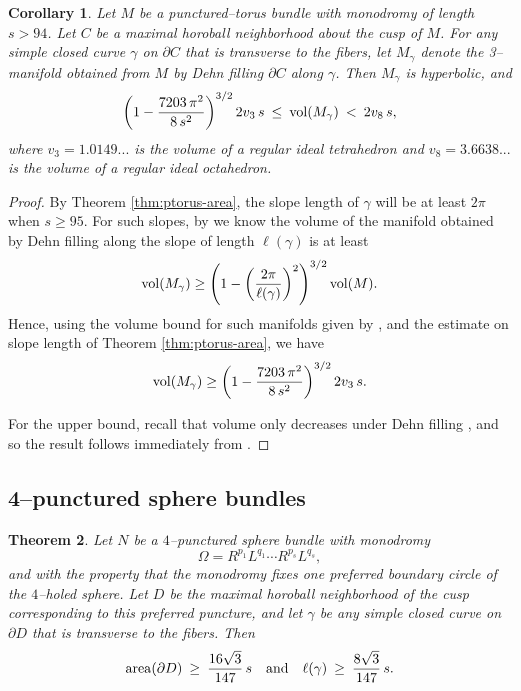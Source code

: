 \documentclass[11pt]{amsart}
\newcommand{\vol}{{\rm vol}}
\newcommand{\area}{{\rm area}}
\newcommand{\bdy}{{\partial}}
\theoremstyle{plain}
\newtheorem{theorem}{Theorem}[section]
\newtheorem{corollary}[theorem]{Corollary}
\theoremstyle{definition}
\begin{document}
\begin{corollary}\label{cor:ptorus-volume}
Let $M$ be a punctured--torus bundle with monodromy of length $s>94$.
Let $C$ be a maximal horoball neighborhood about the cusp of $M$.  For
any simple closed curve $\gamma$ on $\bdy C$ that is transverse to the
fibers, let $M_{\gamma}$ denote the 3--manifold obtained from $M$ by
Dehn filling $\bdy C$ along $\gamma$.  Then $M_{\gamma}$ is
hyperbolic, and
$$ \left(1-\dfrac{7203 \, \pi^2 }{8 \, s^2} \right)^{3/2} 2 v_3 \, s\:
 \leq \: \vol(M_{\gamma}) \: < \: 2v_8 \, s,
$$
where $v_3 = 1.0149...$ is the volume of a regular ideal tetrahedron
and $v_8 = 3.6638...$ is the volume of a regular ideal octahedron.
\end{corollary}

\begin{proof}
By Theorem \ref{thm:ptorus-area}, the slope length of $\gamma$ will be
at least $2\pi$ when $s\geq 95$.  For such slopes, by \cite[Theorem
1.1]{fkp-07} we know the volume of the manifold obtained by Dehn
filling along the slope of length $\ell(\gamma)$ is at least
$$\vol(M_{\gamma}) \geq \left( 1-\left(\frac{2\pi}{\ell(\gamma)}
\right)^2 \right)^{3/2}\vol(M).$$
%
Hence, using the volume bound for such manifolds given by
\cite[Theorem B.1]{gf:two-bridge}, and the estimate on slope length of
Theorem \ref{thm:ptorus-area}, we have
$$\vol(M_{\gamma}) \geq \left(1-\dfrac{7203\,\pi^2}{8\, s^2}\right)^{3/2}
2 v_3 \, s.$$

For the upper bound, recall that volume only decreases under Dehn
filling \cite{thurston:notes}, and so the result follows immediately
from \cite[Theorem B.1]{gf:two-bridge}.
\end{proof}


\subsection{4--punctured sphere bundles}

\begin{theorem}\label{thm:4ps-area}
Let $N$ be a $4$--punctured sphere bundle with monodromy
$$\Omega = R^{p_1}L^{q_1} \cdots R^{p_s}L^{q_s},$$
%
and with the property that the monodromy fixes one preferred boundary
circle of the $4$--holed sphere.  Let $D$ be the maximal horoball
neighborhood of the cusp corresponding to this preferred puncture, and
let $\gamma$ be any simple closed curve on $\bdy D$ that is transverse
to the fibers.  Then
$$\area(\bdy D) \: \geq \: \frac{16 \sqrt{3}}{147} \, s \quad \mbox{and}
\quad \ell(\gamma) \: \geq \: \frac{8\sqrt{3}}{147} \, s.$$
\end{theorem}
\end{document}

